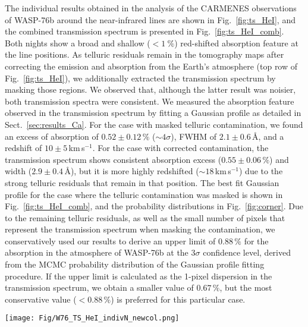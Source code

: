 \documentclass{aa}
\begin{document}
The individual results obtained in the analysis of the CARMENES observations of WASP-76b around the near-infrared  lines are shown in Fig.~\ref{fig:ts_HeI}, and the combined transmission spectrum is presented in Fig.~\ref{fig:ts_HeI_comb}. Both nights show a broad and shallow ($<1~\%$) red-shifted absorption feature at the  line positions. As telluric residuals remain in the tomography maps after correcting the emission and absorption from the Earth's atmosphere (top row of Fig.~\ref{fig:ts_HeI}), we additionally extracted the transmission spectrum by masking those regions. We observed that, although the latter result was noisier, both transmission spectra were consistent. We measured the  absorption feature observed in the transmission spectrum by fitting a Gaussian profile as detailed in Sect.~\ref{sec:results_Ca}. 
For the case %
with masked telluric contamination, %
we found an excess of absorption of $0.52\pm0.12\,\%$ ($\sim4\sigma$), FWHM of $2.1\pm0.6$\,{\AA}, and a redshift of $10\pm5$\,km\,s$^{-1}$. For the case %
with corrected contamination, %
the transmission spectrum shows consistent absorption excess ($0.55\pm0.06\,\%$) and width ($2.9\pm0.4$\,{\AA}), but it is more highly redshifted ($\sim18$\,km\,s$^{-1}$) due to the strong telluric residuals that remain in that position. The best fit Gaussian profile for the case where the telluric contamination was masked is shown in Fig.~\ref{fig:ts_HeI_comb}, and the probability distributions in Fig.~\ref{fig:corner}. Due to the remaining telluric residuals, as well as the small number of pixels that represent the transmission spectrum when masking the contamination, we conservatively used our results to derive an upper limit of $0.88\,\%$ for the  absorption in the atmosphere of WASP-76b at the 3$\sigma$ confidence level, derived from the MCMC probability distribution of the Gaussian profile fitting procedure. If the upper limit is calculated as the 1-pixel dispersion in the transmission spectrum, we obtain a smaller value of $0.67\,\%$, but %
the most conservative value ($<0.88\,\%$) is preferred for this particular case.


\begin{figure*}[]
\centering
\texttt{[image: Fig/W76\_TS\_HeI\_indivN\_newcol.png]}
\caption{{Results around the  lines for the first ({\em left panel}) and the second night ({\em right panel}). 
{\em Top row}: tomography map obtained correcting the telluric absorption and emission lines. Middle row: same as top row but masking the telluric contamination (white regions). 
{\em Bottom row}: transmission spectrum obtained correcting the telluric lines (black), and masking the lines (orange). The light coloured region show the error bars of the original data sampling and the data binned by $0.2$\,{\AA} are shown in dots.}}
\label{fig:ts_HeI}
\end{figure*}
\end{document}
